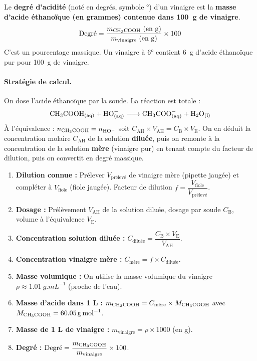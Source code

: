 \documentclass[11pt]{article}
\begin{document}
\begin{definition}
Le \textbf{degré d'acidité} (noté en degrés, symbole °) d'un vinaigre est la \textbf{masse d'acide éthanoïque (en grammes) contenue dans \SI{100}{g} de vinaigre}.
\[
\text{Degré} = \frac{m_{\ce{CH3COOH}}\text{ (en g)}}{m_{\text{vinaigre}}\text{ (en g)}} \times 100
\]
C'est un pourcentage massique. Un vinaigre à 6° contient \SI{6}{g} d'acide éthanoïque pur pour \SI{100}{g} de vinaigre.
\end{definition}

\paragraph{Stratégie de calcul.}
On dose l'acide éthanoïque par la soude. La réaction est totale :
\[
\ce{CH3COOH_{(aq)} + HO^{-}_{(aq)} -> CH3COO^{-}_{(aq)} + H2O_{(l)}}
\]
À l'équivalence : $n_{\ce{CH3COOH}} = n_{\ce{HO-}}$ soit $C_\text{AH} \times V_\text{AH} = C_\text{B} \times V_\text{E}$.
On en déduit la concentration molaire $C_\text{AH}$ de la solution \textbf{diluée}, puis on remonte à la concentration de la solution \textbf{mère} (vinaigre pur) en tenant compte du facteur de dilution, puis on convertit en degré massique.

\begin{methode}
\begin{enumerate}
\item \textbf{Dilution connue :} Prélever $V_\text{prélevé}$ de vinaigre mère (pipette jaugée) et compléter à $V_\text{fiole}$ (fiole jaugée). Facteur de dilution $f = \dfrac{V_\text{fiole}}{V_\text{prélevé}}$.
\item \textbf{Dosage :} Prélèvement $V_\text{AH}$ de la solution diluée, dosage par soude $C_\text{B}$, volume à l'équivalence $V_\text{E}$.
\item \textbf{Concentration solution diluée :} $C_\text{diluée} = \dfrac{C_\text{B} \times V_\text{E}}{V_\text{AH}}$.
\item \textbf{Concentration vinaigre mère :} $C_\text{mère} = f \times C_\text{diluée}$.
\item \textbf{Masse volumique :} On utilise la masse volumique du vinaigre $\rho \approx \SI{1,01}{g.mL^{-1}}$ (proche de l'eau).
\item \textbf{Masse d'acide dans 1 L :} $m_{\ce{CH3COOH}} = C_\text{mère} \times M_{\ce{CH3COOH}}$ avec $M_{\ce{CH3COOH}} = \SI{60,05}{g.mol^{-1}}$.
\item \textbf{Masse de 1 L de vinaigre :} $m_{\text{vinaigre}} = \rho \times 1000$ (en g).
\item \textbf{Degré :} $\text{Degré} = \dfrac{m_{\ce{CH3COOH}}}{m_{\text{vinaigre}}} \times 100$.
\end{enumerate}
\end{methode}
\end{document}
